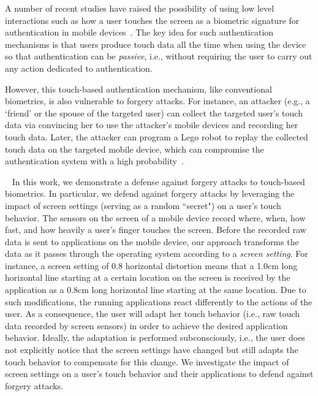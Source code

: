 \documentclass{sig-alternate-05-2015}
\newcommand{\myparatight}[1]{\smallskip\noindent{\bf {#1}:}~}
\begin{document}
A number of recent studies have raised the possibility of using low level
interactions such as how a user touches the screen  as a biometric signature for authentication in
mobile devices~\cite{bo2013silentsense, munichGuys, frank2013touchalytics,
li2013unobservable, sae2012investigating}.  The key idea for such authentication
mechanisms is that users produce touch data all the time when using the device so
that authentication can be \emph{passive}, i.e., without requiring  the user to
carry out any action dedicated to authentication. 





However, this touch-based authentication mechanism, like conventional
biometrics, is also vulnerable to forgery attacks. For instance, an attacker
(e.g., a `friend' or the spouse of the targeted user) can collect the targeted
user's touch data via convincing her to use the attacker's mobile devices and
recording her touch data. Later, the attacker can program a Lego robot to replay
the collected touch data on the targeted mobile device, which can compromise the
authentication system with  a high probability~\cite{attack-CCS13}.  




 
\myparatight{Our work} In this work, we demonstrate a defense against forgery
attacks to touch-based biometrics. 
In particular, we  defend against forgery attacks by leveraging the impact of
screen settings (serving as a random ``secret") on a user's touch behavior. The
sensors on the screen of a mobile device record where, when, how fast, and how
heavily a user's finger touches the screen.  Before the recorded raw data is
sent to applications on the mobile device, our approach transforms the data as
it passes through the operating system according to a \emph{screen setting}.
For instance, a screen setting of 0.8 horizontal distortion means that a 1.0cm
long horizontal line starting at a certain location  on the screen is received
by the application as a 0.8cm long horizontal line starting at the same
location. Due to such modifications, the running applications react differently
to the actions of the user. As a consequence, the user will adapt her touch
behavior (i.e., raw touch data recorded by screen sensors) in order to achieve
the desired application behavior.  Ideally, the adaptation is performed
subconsciously, i.e., the user does not explicitly notice that the screen
settings have changed but still adapts the touch behavior to compensate for this
change. We investigate the impact of screen settings on a user's touch behavior
and their applications to defend against forgery attacks. 
\end{document}

